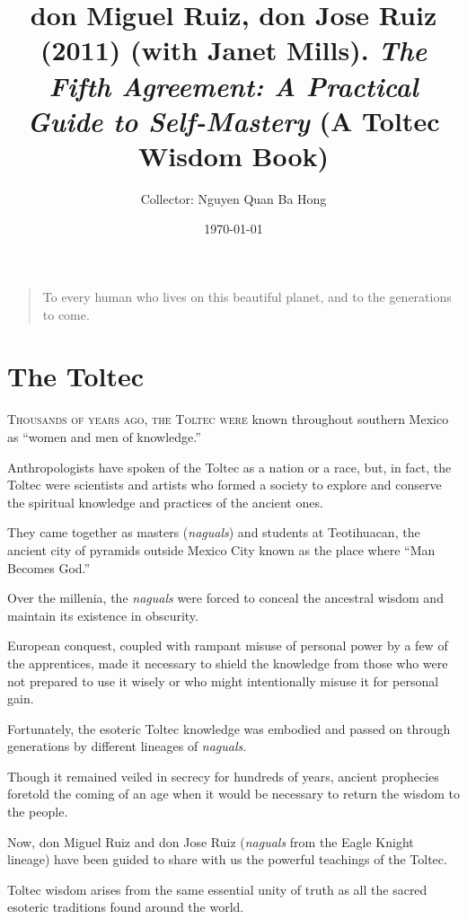 \documentclass{article}
\title{don Miguel Ruiz, don Jose Ruiz (2011) (with Janet Mills). \textit{The Fifth Agreement: A Practical Guide to Self-Mastery} (A Toltec Wisdom Book)}
\author{Collector: Nguyen Quan Ba Hong}
\date{\today}
\numberwithin{equation}{section}
\begin{document}
\maketitle
\setcounter{secnumdepth}{6}
\setcounter{tocdepth}{6}
\tableofcontents


\begin{quotation}
    To every human who lives on this beautiful planet, and to the generations to come.
\end{quotation}

\section*{The Toltec}
\textsc{Thousands of years ago, the Toltec were} known throughout southern Mexico as ``women and men of knowledge.''

Anthropologists have spoken of the Toltec as a nation or a race, but, in fact, the Toltec were scientists and artists who formed a society to explore and conserve the spiritual knowledge and practices of the ancient ones.

They came together as masters (\textit{naguals}) and students at Teotihuacan, the ancient city of pyramids outside Mexico City known as the place where ``Man Becomes God.''

Over the millenia, the \textit{naguals} were forced to conceal the ancestral wisdom and maintain its existence in obscurity.

European conquest, coupled with rampant misuse of personal power by a few of the apprentices, made it necessary to shield the knowledge from those who were not prepared to use it wisely or who might intentionally misuse it for personal gain.

%
Fortunately, the esoteric Toltec knowledge was embodied and passed on through generations by different lineages of \textit{naguals}.

Though it remained veiled in secrecy for hundreds of years, ancient prophecies foretold the coming of an age when it would be necessary to return the wisdom to the people.

Now, don Miguel Ruiz and don Jose Ruiz (\textit{naguals} from the Eagle Knight lineage) have been guided to share with us the powerful teachings of the Toltec.

%
Toltec wisdom arises from the same essential unity of truth as all the sacred esoteric traditions found around the world.
\end{document}
